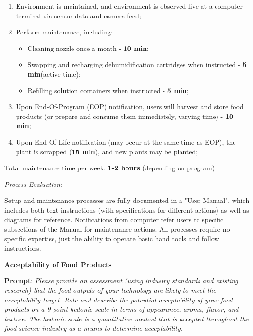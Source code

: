 \documentclass{report}
\begin{document}
\begin{enumerate}
    \item Environment is maintained, and environment is observed live at a computer terminal via sensor data and camera feed;
    \item Perform maintenance, including:
    \begin{itemize}
        \item Cleaning nozzle once a month - \textbf{10 min}\footnotemark[3];
        \item Swapping and recharging dehumidification cartridges when instructed - \textbf{5 min}\footnotemark[2] (active time);
        \item Refilling solution containers when instructed - \textbf{5 min}\footnotemark[2];
    \end{itemize}
    \item Upon End-Of-Program (EOP) notification, users will harvest and store food products (or prepare and consume them immediately, varying time) - \textbf{10 min}\footnotemark[1];
    \item Upon End-Of-Life notification (may occur at the same time as EOP), the plant is scrapped (\textbf{15 min}), and new plants may be planted;
\end{enumerate}

Total maintenance time per week: \textbf{1-2 hours} (depending on program)

\newpage

\textit{Process Evaluation}:

Setup and maintenance processes are fully documented in a "User Manual", which includes both text instructions (with specifications for different actions) as well as diagrams for reference. Notifications from computer refer users to specific subsections of the Manual for maintenance actions. All processes require no specific expertise, just the ability to operate basic hand tools and follow instructions.

\textbf{Acceptability of Food Products}
\label{sec:acceptability-products}

\textbf{Prompt}: \textit{Please provide an assessment (using industry standards and existing research) that the food outputs of your technology are likely to meet the acceptability target. Rate and describe the potential acceptability of your food products on a 9 point hedonic scale in terms of appearance, aroma, flavor, and texture. The hedonic scale is a quantitative method that is accepted throughout the food science industry as a means to determine acceptability.}
\end{document}
